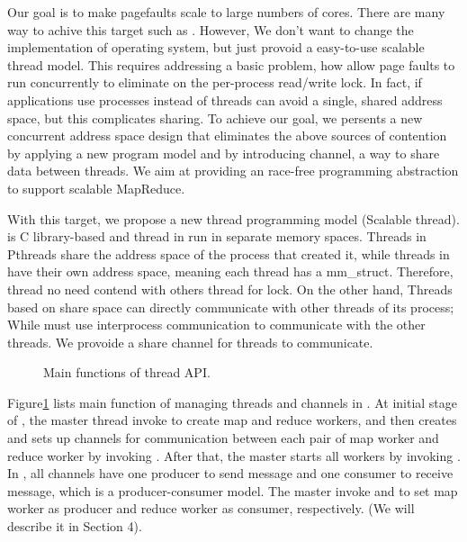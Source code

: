 Our goal is to make pagefaults scale to 
large numbers of cores.
There are many way to achive this target such as \cite{Clements2012Scalable}.
However, We don't want to change the implementation of operating system, 
but just provoid a easy-to-use scalable thread model.
This requires addressing a basic problem,
how allow page faults to run concurrently 
to eliminate on the per-process read/write lock.
In fact, if applications use processes instead of threads can avoid a single, 
shared address space, but this complicates sharing.
To achieve our goal, we persents a new concurrent address space design 
that eliminates the above sources of contention by applying a new program model and by introducing channel, a way to share data between threads.
We aim at providing an race-free programming abstraction 
to support scalable MapReduce.


With this target, we propose a new thread programming model \myth(Scalable thread).
\myth is C library-based and 
thread in \myth run in separate memory spaces.
Threads in Pthreads share the address space of the process that created it, 
while threads in \myth have their own address space,
meaning each thread has a mm\_struct.
Therefore, thread no need contend with others thread for lock.
On the other hand,
Threads based on share space can directly communicate with other threads of its process; 
While \myth must use interprocess communication to communicate with the other threads.
We provoide a share channel for threads to communicate.


\label{sec:pm:thread}
\begin{figure}[htpb]

\caption{Main functions of \myds thread API.}
\label{fig:api:thread}
\end{figure}

Figure\ref{fig:api:thread} lists main function of managing threads and channels in \myth.
At initial stage of \myds, the master thread invoke 
 to create map and reduce workers, 
and then creates and sets up channels for communication between each pair of map worker and reduce worker by invoking .
After that, the master starts all workers by invoking .
In \myds, all channels have one producer 
to send message and one consumer to receive message, 
which is a producer-consumer model.
The master invoke  and  
to set map worker as producer and reduce worker as consumer, respectively.
(We will describe it in Section 4). 

